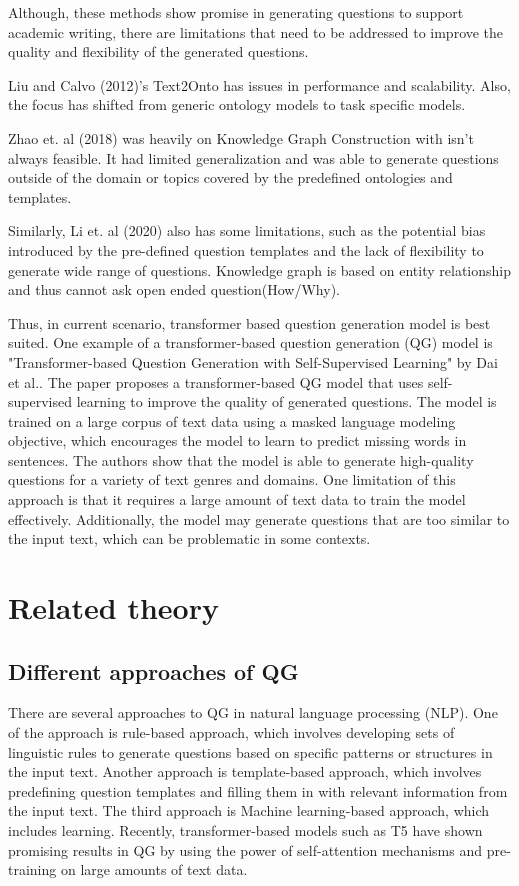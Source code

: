 \documentclass[12pt]{report}
\begin{document}
Although, these methods show promise in generating questions to support academic writing, there are limitations that need to be addressed to improve the quality and flexibility of the generated questions. 

Liu and Calvo (2012)'s Text2Onto has issues in performance and scalability. Also, the focus has shifted from generic ontology models to task specific models.

Zhao et. al (2018) was heavily on Knowledge Graph Construction with isn't always feasible. It had limited generalization and was able to generate questions outside of the domain or topics covered by the predefined ontologies and templates.

Similarly,  Li et. al (2020) also has some limitations, such as the potential bias introduced by the pre-defined question templates and the lack of flexibility to generate wide range of questions. Knowledge graph is based on entity relationship and thus cannot ask open ended question(How/Why).

Thus, in current scenario, transformer based question generation model is best suited.  One example of a transformer-based question generation (QG) model is "Transformer-based Question Generation with Self-Supervised Learning" by Dai et al.\cite{dai2020}. The paper proposes a transformer-based QG model that uses self-supervised learning to improve the quality of generated questions. The model is trained on a large corpus of text data using a masked language modeling objective, which encourages the model to learn to predict missing words in sentences. The authors show that the model is able to generate high-quality questions for a variety of text genres and domains. One limitation of this approach is that it requires a large amount of text data to train the model effectively. Additionally, the model may generate questions that are too similar to the input text, which can be problematic in some contexts.
\section{Related theory}
 \subsection{Different approaches of QG}
 There are several approaches to QG in natural language processing (NLP). One of the approach is rule-based approach, which involves developing sets of linguistic rules to generate questions based on specific patterns or structures in the input text. Another approach is template-based approach, which involves predefining question templates and filling them in with relevant information from the input text. The third approach is Machine learning-based approach, which includes learning. Recently, transformer-based models such as T5 have shown promising results in QG  by using the power of self-attention mechanisms and pre-training on large amounts of text data.
\end{document}
